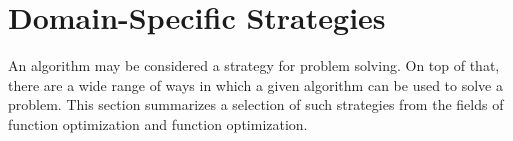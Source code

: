\documentclass[a4paper, 11pt]{article}
\begin{document}
%
% 
% 
% 

%
%
\section{Domain-Specific Strategies}
An algorithm may be considered a strategy for problem solving. On top of that, there are a wide range of ways in which a given algorithm can be used to solve a problem. This section summarizes a selection of such strategies from the fields of function optimization and function optimization.

%
%
\end{document}
